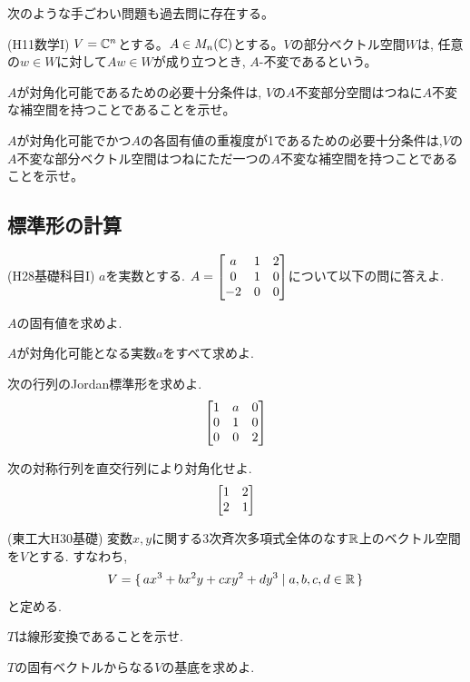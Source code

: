 次のような手ごわい問題も過去問に存在する。
\begin{egprob} (H11数学I)
$V=\mathbb{C}^n$とする。$A\in M_{n}(\mathbb{C})$とする。$V$の部分ベクトル空間$W$は, 任意の$w\in W$に対して$Aw\in W$が成り立つとき, $A$-不変であるという。
\ben
\item $A$が対角化可能であるための必要十分条件は, $V$の$A$不変部分空間はつねに$A$不変な補空間を持つことであることを示せ。
\item $A$が対角化可能でかつ$A$の各固有値の重複度が1であるための必要十分条件は,$V$の$A$不変な部分ベクトル空間はつねにただ一つの$A$不変な補空間を持つことであることを示せ。
\een
\end{egprob}












\subsection{標準形の計算}

\begin{egprob} (H28基礎科目I)
$a$を実数とする. $A = \begin{bmatrix}a&1&2\\ 0&1&0 \\ -2 & 0 & 0\end{bmatrix}$について以下の問に答えよ.
\ben
\item $A$の固有値を求めよ.
\item $A$が対角化可能となる実数$a$をすべて求めよ.
\een
\end{egprob}

\begin{egprob}
次の行列のJordan標準形を求めよ.
\[
\begin{bmatrix}
1 & a & 0 \\
0 & 1 & 0\\
0 & 0 & 2
\end{bmatrix}
\]

\end{egprob}

\begin{egprob}
次の対称行列を直交行列により対角化せよ.
\[
\begin{bmatrix}1 & 2\\ 2 & 1\end{bmatrix}
\]
\end{egprob}



\begin{egprob} (東工大H30基礎)
変数$x,y$に関する3次斉次多項式全体のなす$\mathbb{R}$上のベクトル空間を$V$とする. すなわち,
\[V = \set{ax^3 + bx^2y + cxy^2 + dy^3\mid a,b,c,d\in \mathbb{R}}\]
と定める.
\ben
\item $T$は線形変換であることを示せ.
\item $T$の固有ベクトルからなる$V$の基底を求めよ.
\een
\end{egprob}


